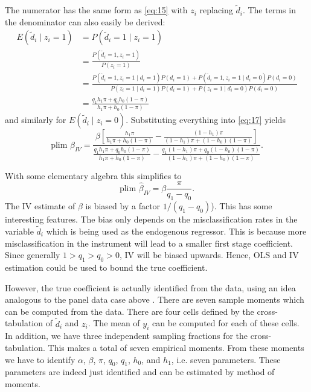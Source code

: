 \documentclass[12pt]{article}
\begin{document}
The numerator has the same form as \eqref{eq:15} with $z_i$ replacing $\tilde{d}_i$. The terms in the denominator can also easily be derived:
\begin{align*}
E(\tilde{d}_i \mid z_i = 1) &= P(\tilde{d}_i = 1 \mid z_i = 1)\\
&= \frac{P(\tilde{d}_i = 1, z_i = 1)}{P(z_i = 1)}\\
&= \frac{P(\tilde{d}_i = 1, z_i = 1 \mid d_i = 1)P(d_i = 1) + P(\tilde{d}_i = 1, z_i = 1 \mid d_i = 0)P(d_i = 0)}{P(z_i = 1 \mid d_i = 1)P(d_i = 1) + P(z_i = 1 \mid d_i = 0)P(d_i = 0)}\\
&= \frac{q_1h_1\pi + q_0h_0(1 - \pi)}{h_1\pi + h_0(1 - \pi)}
\end{align*}
and similarly for $E(\tilde{d}_i \mid z_i = 0)$. Substituting everything into \eqref{eq:17} yields
\[
\text{plim } \hat{\beta}_{IV} = \frac{\beta\left[\frac{h_1\pi}{h_1\pi + h_0(1-\pi)} - \frac{(1-h_1)\pi}{(1-h_1)\pi + (1-h_0)(1-\pi)}\right]}{\frac{q_1h_1\pi + q_0h_0(1-\pi)}{h_1\pi + h_0(1-\pi)} - \frac{q_1(1-h_1)\pi + q_0(1-h_0)(1-\pi)}{(1-h_1)\pi + (1-h_0)(1-\pi)}}.
\]

With some elementary algebra this simplifies to
\[
\text{plim } \hat{\beta}_{IV} = \beta \frac{\pi}{q_1 - q_0}.
\]
The IV estimate of $\beta$ is biased by a factor $1/(q_1 - q_0)$). This has some interesting features. The bias only depends on the misclassification rates in the variable $\tilde{d}_i$ which is being used as the endogenous regressor. This is because more misclassification in the instrument will lead to a smaller first stage coefficient. Since generally $1 > q_1 > q_0 > 0$, IV will be biased upwards. Hence, OLS and IV estimation could be used to bound the true coefficient.

However, the true coefficient is actually identified from the data, using an idea analogous to the panel data case above \cite{Kane_etal_1999}. There are seven sample moments which can be computed from the data. There are four cells defined by the cross-tabulation of $\tilde{d}_i$ and $z_i$. The mean of $y_i$ can be computed for each of these cells. In addition, we have three independent sampling fractions for the cross-tabulation. This makes a total of seven empirical moments. From these moments we have to identify $\alpha$, $\beta$, $\pi$, $q_0$, $q_1$, $h_0$, and $h_1$, i.e. seven parameters. These parameters are indeed just identified and can be estimated by method of moments.
\end{document}

